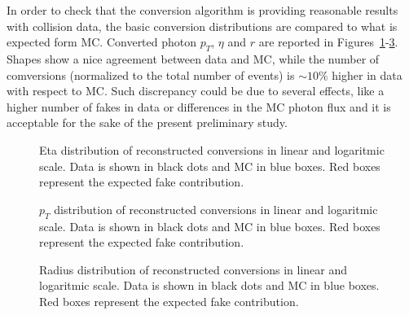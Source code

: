 In order to check that the conversion algorithm is providing
reasonable results with collision data, the basic conversion
distributions are compared to what is expected form MC. Converted
photon $p_T$, $\eta$ and $r$ are reported in
Figures~\ref{fig:eta}-\ref{fig:r}. Shapes show a nice agreement
between data and MC, while the number of comversions (normalized to
the total number of events) is $\sim10\%$ higher in data with respect
to MC. Such discrepancy could be due to several effects, like a higher
number of fakes in data or differences in the MC photon flux
and it is acceptable for the sake of the present preliminary study.
\begin{figure}[!hbtp]
\centering
{}
\caption{Eta distribution of reconstructed conversions in linear and logaritmic scale.
Data is shown in black dots and MC in blue boxes. Red boxes represent the expected fake contribution.}
\label{fig:eta}
\end{figure}

\begin{figure}[!hbtp]
\centering
{}
\caption{$p_T$ distribution of reconstructed conversions in linear and logaritmic scale.
Data is shown in black dots and MC in blue boxes. Red boxes represent the expected fake contribution.}
\label{fig:pt}
\end{figure}

\begin{figure}[!hbtp]
\centering
{}
\caption{Radius distribution of reconstructed conversions in linear and logaritmic scale.
Data is shown in black dots and MC in blue boxes. Red boxes represent the expected fake contribution.}
\label{fig:r}
\end{figure}
